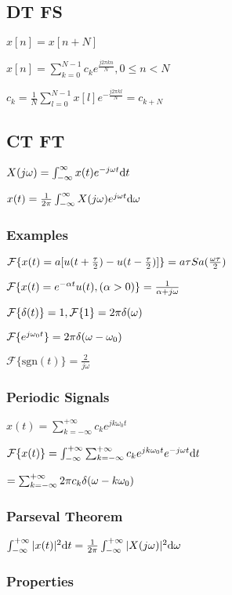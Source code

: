 \subsection{DT FS}

$x[n] = x[n + N]$

$x[n]=\sum_{k=0}^{N-1} c_ke^{\frac{j2\pi k n}{N}}, 0\le n<N$

$c_k=\frac 1 N\sum_{l=0}^{N-1} x[l] e^{-\frac{j2\pi k l}{N}}=c_{k+N}$

\subsection{CT FT}

$X(j\omega) = \int_{-\infty}^{\infty} x(t) e^{-j\omega t} \mathrm{d} t$

$x(t)=\frac{1}{2\pi} \int_{-\infty}^{\infty} X(j\omega) e^{j\omega t}\mathrm{d} \omega$
\subsubsection*{Examples}

$\mathcal{F}\{x(t) = a[u(t+\frac\tau2)-u(t-\frac\tau2)]\} =  a\tau Sa(\frac{\omega\tau}{2})$

$\mathcal{F}\{x(t) = e^{-\alpha t} u(t), (\alpha>0)\}=\frac{1}{\alpha + j\omega}$

$\mathcal{F}\{\delta(t)\}=1, \mathcal{F}\{1\}=2\pi\delta(\omega)$

$\mathcal{F}\{e^{j\omega_0t}\} = 2\pi\delta(\omega-\omega_0)$

$\mathcal{F}\{\text{sgn}(t)\} = \frac{2}{j\omega}$
\subsubsection*{Periodic Signals}

$x(t)=\sum_{k=-\infty}^{+\infty} c_k e^{jk\omega_0 t}$

$\mathcal{F}\{x(t)\}=\int_{-\infty}^{+\infty} \sum_{k=-\infty}^{+\infty} c_ke^{jk\omega_0t} e^{-j\omega t}\mathrm{d} t$

$ = \sum_{k=-\infty}^{+\infty} 2\pi c_k \delta(\omega - k \omega_0)$

\subsubsection*{Parseval Theorem}

$\int_{-\infty}^{+\infty} |x(t)|^2\mathrm{d} t = \frac{1}{2\pi} \int_{-\infty}^{+\infty} |X(j\omega)|^2\mathrm{d} \omega$

\subsubsection*{Properties}

